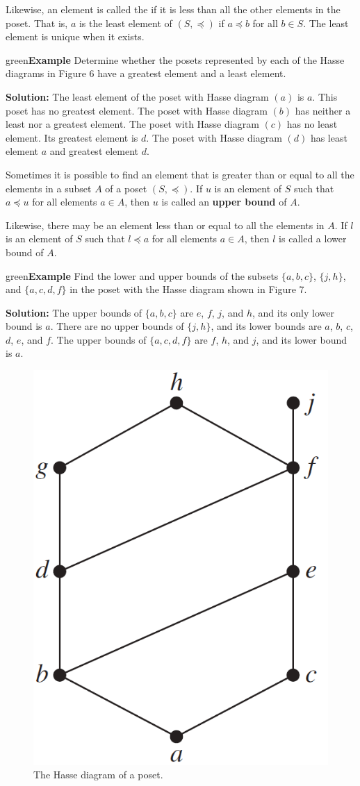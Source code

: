 \documentclass[11pt]{article}
\newenvironment{example}[1][\unskip]{\begin{mybox}{green}{\textbf{Example} {#1}}}{\end{mybox}}
\begin{document}
Likewise, an element is called the  if it is less than all the other elements in the poset. That is, $a$ is the least element of $(S, \preceq)$ if $a \preceq b$ for all $b \in S$. The least element is unique when
it exists.


\begin{example}
Determine whether the posets represented by each of the Hasse diagrams in Figure 6 have a greatest element and a least element.

\textbf{Solution:}
The least element of the poset with Hasse diagram $(a)$ is $a$. This poset has no greatest element. The poset with Hasse diagram $(b)$ has neither a least nor a greatest element. The poset with Hasse diagram $(c)$ has no least element. Its greatest element is $d$. The poset with Hasse diagram $(d)$ has least element $a$ and greatest element $d$.
\end{example}

\newpage
Sometimes it is possible to find an element that is greater than or equal to all the elements in a subset $A$ of a poset $(S, \preceq)$. If $u$ is an element of $S$ such that $a \preceq u$ for all elements $a \in A$, then $u$ is called an \textbf{upper bound} of $A$. 

Likewise, there may be an element less than or equal to all the elements in $A$. If $l$ is an element of $S$ such that $l \preceq a$ for all elements $a \in A$, then $l$ is called a lower bound of $A$.

\begin{example}
Find the lower and upper bounds of the subsets $\{a, b, c\}$, $\{j, h\}$, and $\{a, c, d, f\}$ in the poset with the Hasse diagram shown in Figure 7.

\textbf{Solution:}
The upper bounds of $\{a, b, c\}$ are $e$, $f$, $j$, and $h$, and its only lower bound is $a$. There are no upper bounds of $\{j, h\}$, and its lower bounds are $a$, $b$, $c$, $d$, $e$, and $f$. The upper bounds of $\{a, c, d, f \}$ are $f$, $h$, and $j$, and its lower bound is $a$.
\end{example}

\begin{figure}[h!]
    \centering
    \includegraphics[width=.3\textwidth]{img/ch9.6-f7.png}
    \caption{The Hasse diagram of a poset.}
    \label{fig:my_label}
\end{figure}
\end{document}

